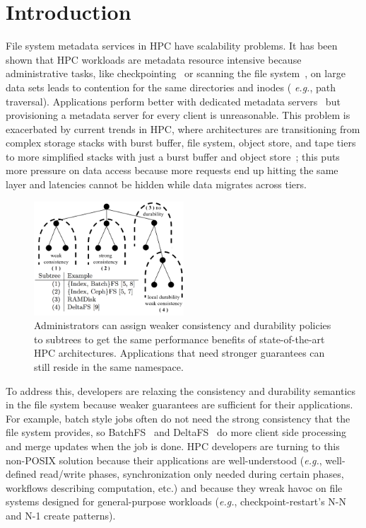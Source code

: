 \section{Introduction}

File system metadata services in HPC have scalability problems. It has been
shown that HPC workloads are metadata resource intensive because administrative
tasks, like checkpointing~\cite{bent_plfs_2009} or scanning the file
system~\cite{zheng:pdsw2014-batchfs}, on large data sets leads to contention
for the same directories and inodes ({\it
e.g.}, path traversal). Applications perform better with dedicated metadata
servers~\cite{sevilla:sc15-mantle, ren:sc2014-indexfs} but provisioning a
metadata server for every client is unreasonable. This problem is exacerbated
by current trends in HPC, where architectures are transitioning from complex
storage stacks with burst buffer, file system, object store, and tape tiers to
more simplified stacks with just a burst buffer and object
store~\cite{bent:login16-hpc-trends}; this puts more pressure on data access
because more requests end up hitting the same layer and latencies cannot be 
hidden while data migrates across tiers.

\begin{figure}[tb]
\centering
\includegraphics[width=0.5\textwidth]{figures/subtree-policies.png}
\caption{Administrators can assign weaker consistency and durability policies
to subtrees to get the same performance benefits of state-of-the-art HPC
architectures. Applications that need stronger guarantees can still reside in
the same namespace.
}\label{fig:subtree-policies}
\end{figure}


To address this, developers are relaxing the consistency and durability
semantics in the file system because weaker guarantees are sufficient for their
applications. For example, batch style jobs often do not need the strong
consistency that the file system provides, so
BatchFS~\cite{zheng:pdsw2014-batchfs} and DeltaFS~\cite{zheng:pdsw2015-deltafs}
do more client side processing and merge updates when the job is done. HPC
developers are turning to this non-POSIX solution because their applications
are well-understood ({\it e.g.}, well-defined read/write phases,
synchronization only needed during certain phases, workflows describing
computation, etc.) and because they wreak havoc on file systems designed for
general-purpose workloads ({\it e.g.}, checkpoint-restart's N-N and N-1 create
patterns).

